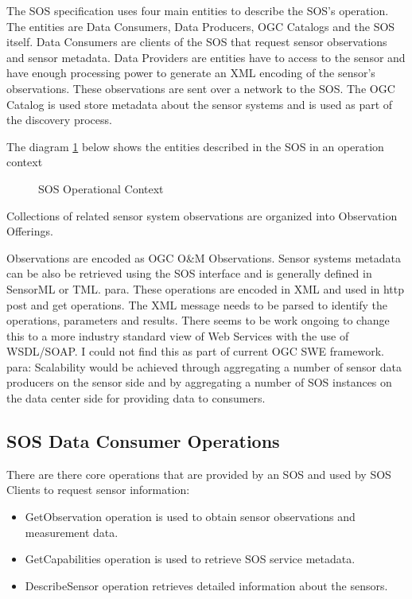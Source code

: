 \documentclass[]{final_report}
\begin{document}
The SOS specification uses four main entities to describe the SOS's operation. The entities are Data Consumers, Data Producers, OGC Catalogs and the SOS itself. Data Consumers are clients of the SOS that request sensor observations and sensor metadata. Data Providers are entities have to access to the sensor and have enough processing power to generate an XML encoding of the sensor's observations. These observations are sent over a network to the SOS. The OGC Catalog is used store metadata about the sensor systems and is used as part of the discovery process.

The diagram \ref{fig:SOSoperationContext} below shows the entities described in the SOS in an operation context
\begin{figure}[h]
\caption{SOS Operational Context}\label{fig:SOSoperationContext}
\end{figure}

Collections of related sensor system observations are organized into Observation
Offerings. 

Observations are encoded as OGC O\&M Observations. Sensor systems metadata can be also be retrieved using the SOS interface and is generally defined in SensorML or TML.
para.  These operations are encoded in XML and used in http post and get operations. The XML message needs to be parsed to identify the operations, parameters and results. There seems to be work ongoing to change this to a more industry standard view of Web Services with the use of WSDL/SOAP. I could not find this as part of current OGC SWE framework.
para: Scalability would be achieved through aggregating a number of
sensor data producers on the sensor side and by aggregating a number of SOS instances
on the data center side for providing data to consumers. 
\subsection{SOS Data Consumer Operations}
There are there core operations that are provided by an SOS and used by SOS Clients to request sensor information:
 \begin{itemize}
\item GetObservation operation is used to obtain sensor observations and measurement data.
\item GetCapabilities operation is used to retrieve SOS service metadata.
\item DescribeSensor operation retrieves detailed information about the sensors.
\end{itemize}
\end{document}
